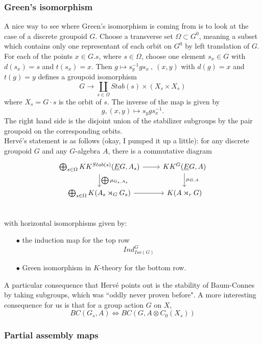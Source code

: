 \subsubsection{Green's isomorphism}

A nice way to see where Green's isomorphism is coming from is to look at the case of a discrete groupoid $G$. Choose a transverse set $\Omega \subset G^0$, meaning a subset which contains only one representant of each orbit on $G^0$ by left translation of $G$. For each of the points $x\in G.s$, where $s\in \Omega$, choose one element $s_x\in G$ with $d(s_x) = s$ and $t(s_x)= x$. Then $g\mapsto s_{y}^{-1}gs_{x} \ , \ (x,y)$ with $d(g)= x$ and $t(g)=y$ defines a groupoid isomorphism
\[ G \rightarrow \coprod_{s\in \Omega} Stab(s) \times (X_s \times X_s) \]
where $X_s =G\cdot s$ is the orbit of $s$. The inverse of the map is given by 
\[g,(x,y) \mapsto s_y g s_x^{-1}.\]
The right hand side is the disjoint union of the stabilizer subgroups by the pair groupoid on the corresponding orbits.\\

Herv\'e's statement is as follows (okay, I pumped it up a little): for any discrete groupoid $G$ and any $G$-algebra $A$, there is a commutative diagram   
\[\begin{tikzcd}
\bigoplus_{s\in \Omega} KK^{Stab(s)}(\underline E G,A_s) \arrow{r}\arrow{d}{\bigoplus \mu_{G_s, A_s}} & KK^G (\underline E G, A) \arrow{d}{\mu_{G,A}} \\
\bigoplus_{s\in \Omega} K(A_s \rtimes_G G_s)  \arrow{r} & K(A\rtimes_r G) \\
\end{tikzcd}\]
with horizontal isomorphisms given by:
\begin{itemize}
\item[$\bullet$] the induction map for the top row
\[Ind_{Iso(G)}^G \]
\item[$\bullet$] Green isomorphism in $K$-theory for the bottom row.
\end{itemize}
A particular consequence that Herv\'e points out is the stability of Baum-Connes by taking subgroups, which was ``oddly never proven before". A more interesting consequence for us is that for a group action $G$ on $X$,
\[BC(G_s, A) \iff BC(G, A\otimes C_0(X_s))\]

\subsubsection{Partial assembly maps}

